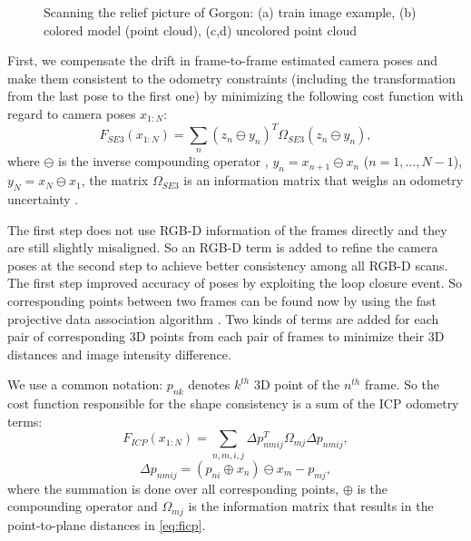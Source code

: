 \documentclass[letterpaper, 10 pt, conference]{ieeeconf}  %
\begin{document}
\begin{figure}[t]
\begin{subfigure}[b]{0.45\linewidth}
                \caption{}
        \end{subfigure}
        \caption{Scanning the relief picture of Gorgon: (a) train image example,
        (b) colored model (point cloud), (c,d) uncolored point cloud}
        \label{fig:gorgon}
\end{figure}

First, we compensate the drift in frame-to-frame estimated camera poses and 
make them consistent to the odometry constraints (including the transformation from the last pose
to the first one) by minimizing the following cost function
with regard to camera poses $x_{1:N}$:
\begin{equation} \label{eq:ffirst}
F_{SE3}(x_{1:N}) = \sum_n (z_n \ominus y_n)^T \Omega_{SE3} (z_n \ominus y_n),
\end{equation}
where $\ominus$ is the inverse compounding operator \cite{lu1997globally},
$y_n=x_{n+1} \ominus x_{n}$ ($n=1,\dots, N-1$), $y_N=x_N \ominus x_1$,
the matrix $\Omega_{SE3}$ is an information matrix that weighs an odometry uncertainty \cite{kuemmerle2011g2o}.

The first step does not use RGB-D information of the frames directly and they are
still slightly misaligned. So an RGB-D term is added to refine the camera poses at the second step 
to achieve better consistency among all RGB-D scans.
The first step improved accuracy of poses by exploiting the loop closure event.
So corresponding points between two frames can be found now by using
the fast projective data association algorithm \cite{rusinkiewicz2001efficient}.
Two kinds of terms are added for each pair of corresponding 3D points from each pair of frames
to minimize their 3D distances and image intensity difference.

We use a common notation: $p_{nk}$ denotes $k^{th}$ 3D point of 
the $n^{th}$ frame. So the cost function responsible for the shape consistency is
a sum of the ICP odometry terms:
\begin{equation} \label{eq:ficp}
    F_{ICP}(x_{1:N}) = \sum_{n,m,i,j} \Delta p_{nmij}^T \Omega_{mj} \Delta p_{nmij},
\end{equation}
\begin{equation}
    \Delta p_{nmij}=(p_{ni} \oplus x_n) \ominus x_m - p_{mj},
\end{equation}
where the summation is done over all corresponding points, $\oplus$ is 
the compounding operator \cite{lu1997globally} and $\Omega_{mj}$ is 
the information matrix that results in the point-to-plane 
distances in \eqref{eq:ficp}.
\end{document}
